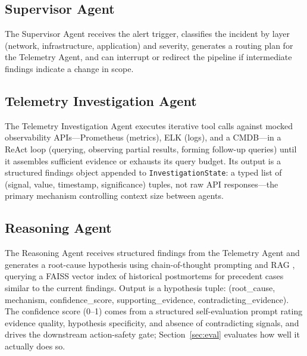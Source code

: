 \documentclass[10pt,conference]{IEEEtran}
\begin{document}
\subsection{Supervisor Agent}
The Supervisor Agent receives the alert trigger, classifies the incident
by layer (network, infrastructure, application) and severity, generates a
routing plan for the Telemetry Agent, and can interrupt or redirect the
pipeline if intermediate findings indicate a change in scope.

\subsection{Telemetry Investigation Agent}
The Telemetry Investigation Agent executes iterative tool calls against
mocked observability APIs---Prometheus \cite{rabenstein2015prometheus}
(metrics), ELK \cite{elastic2024elasticsearch} (logs), and a CMDB---in a
ReAct loop (querying, observing partial results, forming follow-up queries)
until it assembles sufficient evidence or exhausts its query budget. Its
output is a structured findings object appended to
\texttt{InvestigationState}: a typed list of (signal, value, timestamp,
significance) tuples, not raw API responses---the primary mechanism
controlling context size between agents.

\subsection{Reasoning Agent}
The Reasoning Agent receives structured findings from the Telemetry Agent
and generates a root-cause hypothesis using chain-of-thought prompting
\cite{wei2022cot} and RAG \cite{lewis2020rag}, querying a FAISS
\cite{johnson2021faiss} vector index of historical postmortems for
precedent cases similar to the current findings. Output is a hypothesis
tuple: (root\_cause, mechanism, confidence\_score, supporting\_evidence,
contradicting\_evidence). The confidence score (0--1) comes from a
structured self-evaluation prompt rating evidence quality, hypothesis
specificity, and absence of contradicting signals, and drives the
downstream action-safety gate; Section~\ref{sec:eval} evaluates how well it
actually does so.
\end{document}
